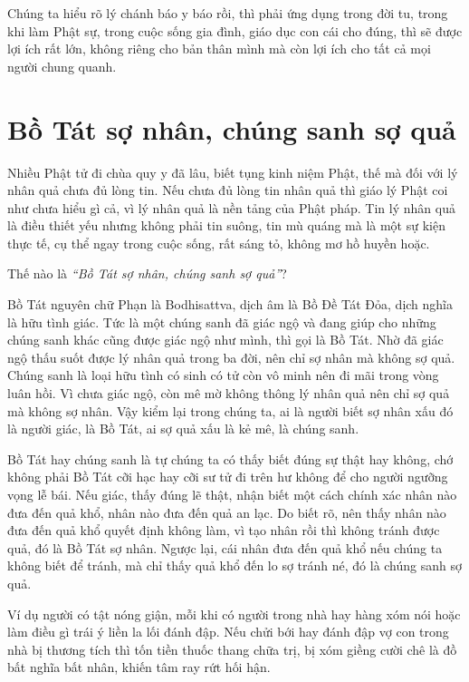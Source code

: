 \documentclass[
  12pt,
  oneside]{book}
\begin{document}
Chúng ta hiểu rõ lý chánh báo y báo rồi, thì phải ứng dụng trong đời tu, trong khi làm Phật sự, trong cuộc sống gia đình, giáo dục con cái cho đúng, thì sẽ được lợi ích rất lớn, không riêng cho bản thân mình mà còn lợi ích cho tất cả mọi người chung quanh.

\hypertarget{bo-tat-so-nhan-chung-sanh-so-qua}{%
\chapter*{Bồ Tát sợ nhân, chúng sanh sợ quả}\label{bo-tat-so-nhan-chung-sanh-so-qua}}

Nhiều Phật tử đi chùa quy y đã lâu, biết tụng kinh niệm Phật, thế mà đối với lý nhân quả chưa đủ lòng tin. Nếu chưa đủ lòng tin nhân quả thì giáo lý Phật coi như chưa hiểu gì cả, vì lý nhân quả là nền tảng của Phật pháp. Tin lý nhân quả là điều thiết yếu nhưng không phải tin suông, tin mù quáng mà là một sự kiện thực tế, cụ thể ngay trong cuộc sống, rất sáng tỏ, không mơ hồ huyền hoặc.

Thế nào là \emph{``Bồ Tát sợ nhân, chúng sanh sợ quả''}?

Bồ Tát nguyên chữ Phạn là Bodhisattva, dịch âm là Bồ Đề Tát Đỏa, dịch nghĩa là hữu tình giác. Tức là một chúng sanh đã giác ngộ và đang giúp cho những chúng sanh khác cũng được giác ngộ như mình, thì gọi là Bồ Tát. Nhờ đã giác ngộ thấu suốt được lý nhân quả trong ba đời, nên chỉ sợ nhân mà không sợ quả. Chúng sanh là loại hữu tình có sinh có tử còn vô minh nên đi mãi trong vòng luân hồi. Vì chưa giác ngộ, còn mê mờ không thông lý nhân quả nên chỉ sợ quả mà không sợ nhân. Vậy kiểm lại trong chúng ta, ai là người biết sợ nhân xấu đó là người giác, là Bồ Tát, ai sợ quả xấu là kẻ mê, là chúng sanh.

Bồ Tát hay chúng sanh là tự chúng ta có thấy biết đúng sự thật hay không, chớ không phải Bồ Tát cỡi hạc hay cỡi sư tử đi trên hư không để cho người ngưỡng vọng lễ bái. Nếu giác, thấy đúng lẽ thật, nhận biết một cách chính xác nhân nào đưa đến quả khổ, nhân nào đưa đến quả an lạc. Do biết rõ, nên thấy nhân nào đưa đến quả khổ quyết định không làm, vì tạo nhân rồi thì không tránh được quả, đó là Bồ Tát sợ nhân. Ngược lại, cái nhân đưa đến quả khổ nếu chúng ta không biết để tránh, mà chỉ thấy quả khổ đến lo sợ tránh né, đó là chúng sanh sợ quả.

Ví dụ người có tật nóng giận, mỗi khi có người trong nhà hay hàng xóm nói hoặc làm điều gì trái ý liền la lối đánh đập. Nếu chửi bới hay đánh đập vợ con trong nhà bị thương tích thì tốn tiền thuốc thang chữa trị, bị xóm giềng cười chê là đồ bất nghĩa bất nhân, khiến tâm ray rứt hối hận.
\end{document}
